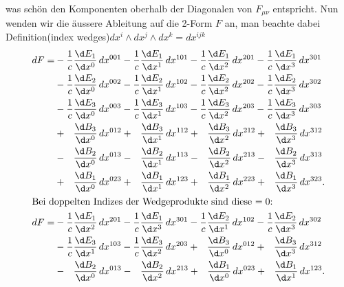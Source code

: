 was schön den Komponenten oberhalb der Diagonalen von $F_{\mu\nu}$ entspricht.
Nun wenden wir die äussere Ableitung auf die 2-Form $F$ an, man beachte dabei Definition(index wedges)$dx^i \wedge dx^j \wedge dx^k = dx^{ijk}$
 \begin{align*}	
 	dF =
 	& -  \frac{1}{c} \frac{\d E_1}{\d x^0} \, dx^{001} - \frac{1}{c} \frac{\d E_1}{\d x^1} \, dx^{101}
 	- \frac{1}{c} \frac{\d E_1}{\d x^2} \, dx^{201} - \frac{1}{c} \frac{\d E_1}{\d x^3} \, dx^{301}
 	\\
 	&- \frac{1}{c} \frac{\d E_2}{\d x^0} \, dx^{002} - \frac{1}{c} \frac{\d E_2}{\d x^1} \, dx^{102}
 	 - \frac{1}{c} \frac{\d E_2}{\d x^2} \, dx^{202} - \frac{1}{c} \frac{\d E_2}{\d x^3} \, dx^{302}
 	\\
 	& - \frac{1}{c} \frac{\d E_3}{\d x^0} \, dx^{003} - \frac{1}{c} \frac{\d E_3}{\d x^1} \, dx^{103}
 	- \frac{1}{c} \frac{\d E_3}{\d x^2} \, dx^{203} - \frac{1}{c} \frac{\d E_3}{\d x^3} \, dx^{303}
 	\\
 	&+ \phantom{\frac{1}{c}}\frac{\d B_3}{\d x^0} \, dx^{012} + \phantom{\frac{1}{c}}\frac{\d B_3}{\d x^1} \, dx^{112}
 	+ \phantom{\frac{1}{c}}\frac{\d B_3}{\d x^2} \, dx^{212} + \phantom{\frac{1}{c}}\frac{\d B_3}{\d x^3} \, dx^{312}
 	\\
 	&- \phantom{\frac{1}{c}}\frac{\d B_2}{\d x^0} \, dx^{013} - \phantom{\frac{1}{c}}\frac{\d B_2}{\d x^1} \, dx^{113}
 	- \phantom{\frac{1}{c}}\frac{\d B_2}{\d x^2} \, dx^{213} - \phantom{\frac{1}{c}}\frac{\d B_2}{\d x^3} \, dx^{313}
 	\\
 	&+ \phantom{\frac{1}{c}}\frac{\d B_1}{\d x^0} \, dx^{023} + \phantom{\frac{1}{c}}\frac{\d B_1}{\d x^1} \, dx^{123}
 	+ \phantom{\frac{1}{c}}\frac{\d B_1}{\d x^2} \, dx^{223} + \phantom{\frac{1}{c}}\frac{\d B_1}{\d x^3} \, dx^{323} .
 	\\
	\intertext{Bei doppelten Indizes der Wedgeprodukte sind diese $=0$:}
	dF
 	=
 	&- \frac{1}{c} \frac{\d E_1}{\d x^2} \, dx^{201} - \frac{1}{c} \frac{\d E_1}{\d x^3} \, dx^{301}
 	 - \frac{1}{c} \frac{\d E_2}{\d x^1} \, dx^{102} - \frac{1}{c} \frac{\d E_2}{\d x^3} \, dx^{302}
 	\\
 	&- \frac{1}{c} \frac{\d E_3}{\d x^1} \, dx^{103} - \frac{1}{c} \frac{\d E_3}{\d x^2} \, dx^{203}
 	 + \phantom{\frac{1}{c}} \frac{\d B_3}{\d x^0} \, dx^{012} + \phantom{\frac{1}{c}} \frac{\d B_3}{\d x^3} \, dx^{312}
 	\\
 	&- \phantom{\frac{1}{c}} \frac{\d B_2}{\d x^0} \, dx^{013} - \phantom{\frac{1}{c}} \frac{\d B_2}{\d x^2} \, dx^{213}
 	 + \phantom{\frac{1}{c}} \frac{\d B_1}{\d x^0} \, dx^{023} + \phantom{\frac{1}{c}} \frac{\d B_1}{\d x^1} \, dx^{123} .  

\end{align*}
